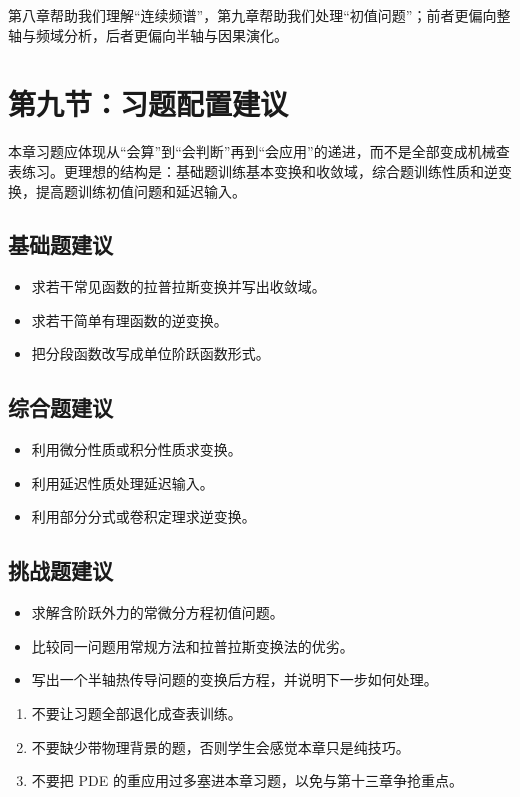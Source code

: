 \begin{tishi}[建议突出的一句话]
第八章帮助我们理解``连续频谱''，第九章帮助我们处理``初值问题''；前者更偏向整轴与频域分析，后者更偏向半轴与因果演化。
\end{tishi}

\section{第九节：习题配置建议}

\begin{wulibj}[习题的角色]
本章习题应体现从``会算''到``会判断''再到``会应用''的递进，而不是全部变成机械查表练习。更理想的结构是：基础题训练基本变换和收敛域，综合题训练性质和逆变换，提高题训练初值问题和延迟输入。
\end{wulibj}

\subsection*{基础题建议}
\begin{itemize}
    \item 求若干常见函数的拉普拉斯变换并写出收敛域。
    \item 求若干简单有理函数的逆变换。
    \item 把分段函数改写成单位阶跃函数形式。
\end{itemize}

\subsection*{综合题建议}
\begin{itemize}
    \item 利用微分性质或积分性质求变换。
    \item 利用延迟性质处理延迟输入。
    \item 利用部分分式或卷积定理求逆变换。
\end{itemize}

\subsection*{挑战题建议}
\begin{itemize}
    \item 求解含阶跃外力的常微分方程初值问题。
    \item 比较同一问题用常规方法和拉普拉斯变换法的优劣。
    \item 写出一个半轴热传导问题的变换后方程，并说明下一步如何处理。
\end{itemize}

\begin{jinshi}[习题配置上的提醒]
\begin{enumerate}
    \item 不要让习题全部退化成查表训练。
    \item 不要缺少带物理背景的题，否则学生会感觉本章只是纯技巧。
    \item 不要把 PDE 的重应用过多塞进本章习题，以免与第十三章争抢重点。
\end{enumerate}
\end{jinshi}
